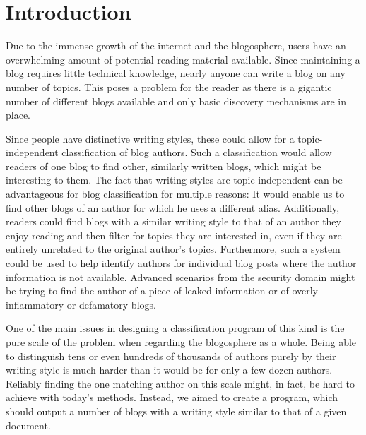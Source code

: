
\section{Introduction}
\label{sec:introduction}

Due to the immense growth of the internet and the blogosphere, users have an overwhelming amount of potential reading material available.
Since maintaining a blog requires little technical knowledge, nearly anyone can write a blog on any number of topics.
This poses a problem for the reader as there is a gigantic number of different blogs available and only basic discovery mechanisms are in place.


Since people have distinctive writing styles, these could allow for a topic-independent classification of blog authors.
Such a classification would allow readers of one blog to find other, similarly written blogs, which might be interesting to them.
The fact that writing styles are topic-independent can be advantageous for blog classification for multiple reasons: It would enable us to find other blogs of an author for which he uses a different alias.
Additionally, readers could find blogs with a similar writing style to that of an author they enjoy reading and then filter for topics they are interested in, even if they are entirely unrelated to the original author's topics.
Furthermore, such a system could be used to help identify authors for individual blog posts where the author information is not available.
Advanced scenarios from the security domain might be trying to find the author of a piece of leaked information or of overly inflammatory or defamatory blogs.


One of the main issues in designing a classification program of this kind is the pure scale of the problem when regarding the blogosphere as a whole.
Being able to distinguish tens or even hundreds of thousands of authors purely by their writing style is much harder than it would be for only a few dozen authors.
Reliably finding the one matching author on this scale might, in fact, be hard to achieve with today's methods.
Instead, we aimed to create a program, which should output a number of blogs with a writing style similar to that of a given document.

